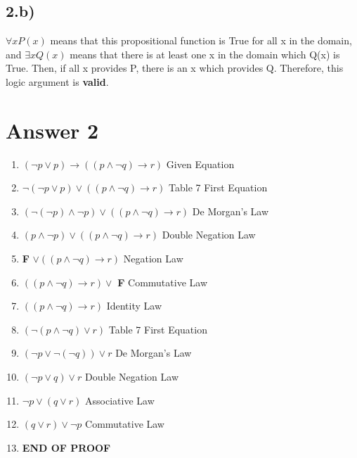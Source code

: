 \documentclass[12pt]{article}
\begin{document}
\subsection*{2.b)}

$\forall xP(x)$ means that this propositional function is True for all x in the domain, and $\exists xQ(x)$ means that there is at least one x in the domain which Q(x) is True. Then, if all x provides P, there is an x which provides Q. Therefore, this logic argument is \textbf{valid}.


\section*{Answer 2}
\begin{enumerate}
	\item $(\neg p \lor p) \to ((p \land \neg q) \to r) $  \hspace{120px} Given Equation
	\item $\neg(\neg p \lor p) \lor ((p \land \neg q ) \to r)$ \hspace {118px} Table 7 First Equation
	\item $ (\neg (\neg p) \land \neg p) \lor ((p \land \neg q) \to r)$ \hspace{100px} De Morgan's Law
	\item $ (p \land \neg p) \lor ((p \land \neg q) \to r)$ \hspace{126px} Double Negation Law
	\item \textbf{F} $ \lor ((p \land \neg q)\to r)$ \hspace{160px} Negation Law
	\item  $((p \land \neg q)\to r)  \lor $ \textbf{F} \hspace{160px} Commutative Law
	\item $((p \land \neg q) \to r)$ \hspace{180px} Identity Law
	\item $(\neg (p \land \neg q) \lor r)$ \hspace{178px} Table 7 First Equation 
	\item $(\neg p \lor \neg (\neg q)) \lor r$ \hspace{170px} De Morgan's Law
	\item $(\neg p \lor q) \lor r$ \hspace{195px} Double Negation Law
	\item $ \neg p \lor (q \lor r)$ \hspace{195px} Associative Law
	\item $ ( q \lor r) \lor \neg p$ \hspace{195px} Commutative Law
	\item \textbf{END OF PROOF}
\end{enumerate}
\end{document}
